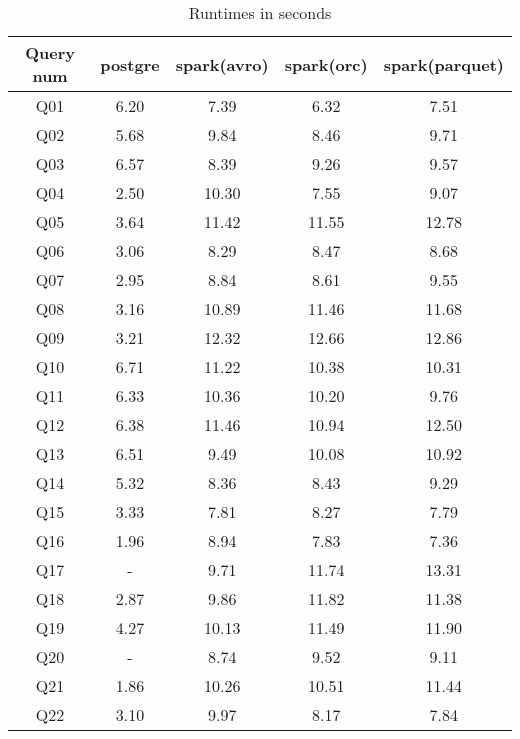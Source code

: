 \documentclass[../main.tex]{subfiles}
\begin{document}
    \begin{table}
        \begin{center}
            \begin{tabular}{ |c|c|c|c|c| } 
            \hline
            Query num & postgre & spark(avro) & spark(orc) & spark(parquet) \\
            \hline
            Q01 & 6.20 & 7.39 & 6.32 & 7.51 \\
            Q02 & 5.68 & 9.84 & 8.46 & 9.71 \\
            Q03 & 6.57 & 8.39 & 9.26 & 9.57 \\
            Q04 & 2.50 & 10.30 & 7.55 & 9.07 \\
            Q05 & 3.64 & 11.42 & 11.55 & 12.78 \\
            Q06 & 3.06 & 8.29 & 8.47 & 8.68 \\
            Q07 & 2.95 & 8.84 & 8.61 & 9.55 \\
            Q08 & 3.16 & 10.89 & 11.46 & 11.68 \\
            Q09 & 3.21 & 12.32 & 12.66 & 12.86 \\
            Q10 & 6.71 & 11.22 & 10.38 & 10.31 \\
            Q11 & 6.33 & 10.36 & 10.20 & 9.76 \\
            Q12 & 6.38 & 11.46 & 10.94 & 12.50 \\
            Q13 & 6.51 & 9.49 & 10.08 & 10.92 \\
            Q14 & 5.32 & 8.36 & 8.43 & 9.29 \\
            Q15 & 3.33 & 7.81 & 8.27 & 7.79 \\
            Q16 & 1.96 & 8.94 & 7.83 & 7.36 \\
            Q17 & - & 9.71 & 11.74 & 13.31 \\
            Q18 & 2.87 & 9.86 & 11.82 & 11.38 \\
            Q19 & 4.27 & 10.13 & 11.49 & 11.90 \\
            Q20 & - & 8.74 & 9.52 & 9.11 \\
            Q21 & 1.86 & 10.26 & 10.51 & 11.44 \\
            Q22 & 3.10 & 9.97 & 8.17 & 7.84 \\
            \hline
            \end{tabular}
            \\[1pt]
            \caption{Runtimes in seconds}
        \end{center}
    \end{table}
\end{document}
